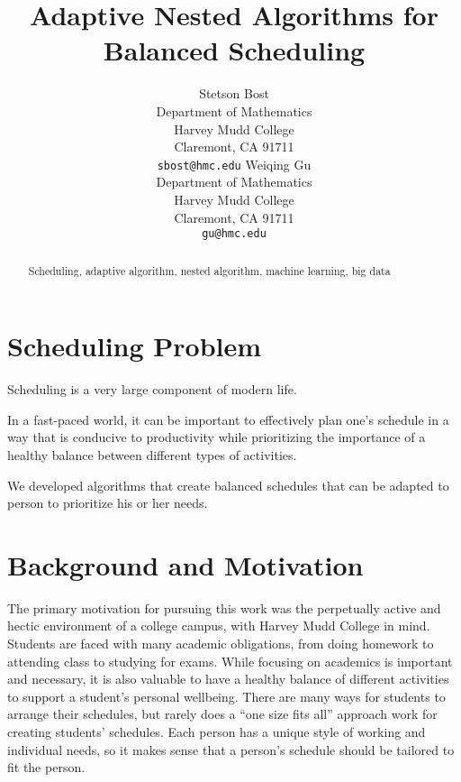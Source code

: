 \documentclass{article}
\title{Adaptive Nested Algorithms for Balanced Scheduling}
\author{
	Stetson Bost\\
	Department of Mathematics\\
	Harvey Mudd College\\
	Claremont, CA 91711 \\
	\texttt{sbost@hmc.edu}
  \And
	Weiqing Gu\\
	Department of Mathematics\\
	Harvey Mudd College\\
	Claremont, CA 91711 \\
	\texttt{gu@hmc.edu}\\
}
\newcommand{\todo}[1]{}
\begin{document}

\maketitle

\begin{abstract}
Scheduling, adaptive algorithm, nested algorithm, machine learning, big data
\end{abstract}

\section{Scheduling Problem}
	Scheduling is a very large component of modern life.
	\todo{``Find details about scheduling, wellness, (work-life) balance, etc.'' + Citations}
	In a fast-paced world, it can be important to effectively plan one's schedule in a way that is conducive to productivity while prioritizing the importance of a healthy balance between different types of activities. 
	\todo{mention need and widespread use of scheduling/applications for calenders}

	We developed algorithms that create balanced schedules that can be adapted to person to prioritize his or her needs.


\section{Background and Motivation}

	The primary motivation for pursuing this work was the perpetually active and hectic environment of a college campus, with Harvey Mudd College in mind.
	Students are faced with many academic obligations, from doing homework to attending class to studying for exams.
	While focusing on academics is important and necessary, it is also valuable to have a healthy balance of different activities to support a student's personal wellbeing.
	There are many ways for students to arrange their schedules, but rarely does a ``one size fits all'' approach work for creating students' schedules.
	Each person has a unique style of working and individual needs, so it makes sense that a person's schedule should be tailored to fit the person.
\end{document}
